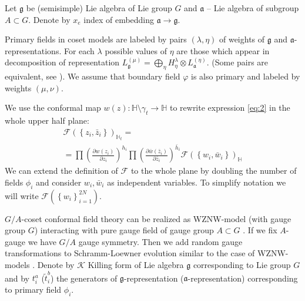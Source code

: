 \documentclass{jetpl}
\newcommand{\gf}{\mathfrak{g}}
\newcommand{\af}{\mathfrak{a}}
\begin{document}
Let $\gf$ be (semisimple) Lie algebra of Lie group $G$ and $\af$ -- Lie algebra of subgroup $A\subset G$. Denote by $x_{e}$ index of embedding $\af\to\gf$. 

Primary fields in coset models are labeled by pairs $(\lambda,\eta)$ of weights of $\gf$ and $\af$-representations. For each $\lambda$ possible values of $\eta$ are those which appear in decomposition of representation $L^{(\mu)}_{\gf}=\bigoplus_{\eta} H^{\lambda}_{\eta}\otimes L^{(\eta)}_{\af}$. (Some pairs are equivalent, see \cite{fuchs1996resolution,schellekens1990field}). We assume that boundary field $\varphi$ is also primary and labeled by weights $(\mu,\nu)$.

  We use the conformal map  $w(z):\mathbb{H}\setminus\gamma_{t}\to \mathbb{H}$ to rewrite expression \eqref{eq:2} in the whole upper half plane:
\begin{multline}
  \mathcal{F}(\left\{z_{i},\bar z_{i}\right\})_{\mathbb{H}_{t}}=\\
  =\prod \left(\frac{\partial w(z_{i})}{\partial z_{i}}\right)^{h_{i}} 
  \prod \left(\frac{\partial \bar w(\bar z_{i})}{\partial \bar z_{i}}\right)^{\bar h_i}
  \mathcal{F}(\left\{w_{i}, \bar w_{i}\right\})_{\mathbb{H}}
  \label{eq:1}
\end{multline}
We can extend the definition of $\mathcal{F}$ to the whole plane by doubling the number of fields $\phi_{i}$ \cite{cardy2004boundary,cardy1984conformal} and consider $w_{i},\bar w_{i}$ as independent variables. To simplify notation we will write $\mathcal{F}(\left\{w_{i}\right\}_{i=1}^{2N})$.


$G/A$-coset conformal field theory can be realized as WZNW-model (with gauge group $G$) interacting with pure gauge field of gauge group $A\subset G$ \cite{gawdzki1988g,figueroa89equivalence}. If we fix $A$-gauge we have $G/A$ gauge symmetry. Then we add random gauge transformations to Schramm-Loewner evolution \cite{2011arXiv1112.4354N} similar to the case of WZNW-models \cite{bettelheim2005stochastic}. Denote by $\mathcal{K}$ Killing form of Lie algebra $\gf$ corresponding to Lie group $G$ and by $t^{a}_{i}$ ($\tilde{t}^{b}_{i}$) the  generators of $\gf$-representation ($\af$-representation) corresponding to primary field $\phi_{i}$.
\end{document}
